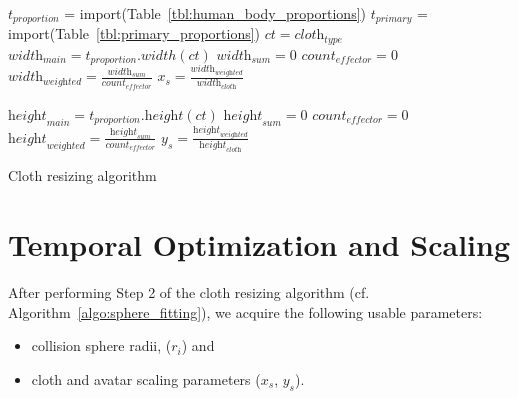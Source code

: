 \begin{algorithm}[ht]
\DontPrintSemicolon %

$t_\textit{proportion}$ = {\textrm import}({\textrm Table~\ref{tbl:human_body_proportions}}) \;
$t_\textit{primary}$ = {\textrm import}({\textrm Table~\ref{tbl:primary_proportions}}) \;
$ct=\textit{cloth}_\textit{type}$\;
$\textit{width}_\textit{main}=t_\textit{proportion}.width(ct)$\;
$\textit{width}_\textit{sum}=0$\;
$\textit{count}_\textit{effector}=0$\;
$\textit{width}_\textit{weighted}=\frac{\textit{width}_\textit{sum}}{\textit{count}_{\textit{effector}}}$\;
$x_s=\frac{\textit{width}_\textit{weighted}}{\textit{width}_\textit{cloth}}$\;

$\textit{height}_\textit{main}=t_\textit{proportion}.\textit{height}(ct)$\;
$\textit{height}_\textit{sum}=0$\;
$\textit{count}_\textit{effector}=0$\;
$\textit{height}_\textit{weighted}=\frac{\textit{height}_\textit{sum}}{\textit{count}_{\textit{effector}}}$\;
$y_s=\frac{\textit{height}_\textit{weighted}}{\textit{height}_\textit{cloth}}$\;
\caption{Cloth resizing algorithm}
\label{algo:cloth_resize}
\end{algorithm}

\section{Temporal Optimization and Scaling}
After performing Step 2 of the cloth resizing algorithm (cf. Algorithm~\ref{algo:sphere_fitting}), we acquire the following usable parameters:

\begin{itemize}
\item collision sphere radii, ($r_i$) and
\item cloth and avatar scaling parameters ($x_s$, $y_s$).
\end{itemize}

